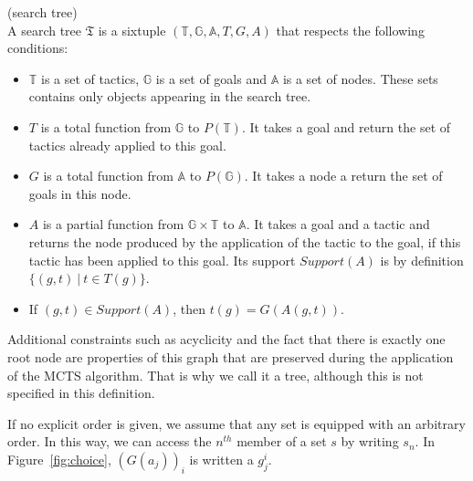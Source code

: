 \documentclass[runningheads,a4paper,draft]{svjour3}
\begin{document}
\begin{definition}(search tree)\\
A search tree $\mathfrak{T}$ is a sixtuple 
$(\mathbb{T},\mathbb{G},\mathbb{A},T,G,A)$ 
that respects the following conditions:
\begin{itemize}
\item $\mathbb{T}$ is a set of tactics, $\mathbb{G}$ is a set of goals 
 and $\mathbb{A}$ is a set of nodes. These sets contains only objects 
 appearing in the search tree.
\item $T$ is a total function from $\mathbb{G}$ to $P(\mathbb{T})$. It takes a 
goal and return the set of tactics already applied to this goal.
\item $G$ is a total function from $\mathbb{A}$ to $P(\mathbb{G})$. It takes a 
node a return the set of goals in this node.

\item $A$ is a partial function from $\mathbb{G} \times \mathbb{T}$ to 
$\mathbb{A}$. It takes a goal and a tactic and returns the node produced by the 
application of the tactic to the goal, if this tactic has been applied to this 
goal. Its support $Support(A)$ is by definition $\lbrace (g,t)\ |\ t \in T(g) 
\rbrace$.
\item If $(g,t) \in Support (A)$, then $t(g) = G(A(g,t))$.
\end{itemize}

Additional constraints such as acyclicity and the fact that there is exactly 
one root node are properties of this graph that are preserved during the 
application of the MCTS algorithm. That is why we call it a tree, although this 
is not specified in this definition.
\end{definition}

If no explicit order is given, we assume that any set is equipped with an 
arbitrary order. In this way, we can access the $n^{th}$ member of a set $s$ by 
writing $s_n$. In Figure~\ref{fig:choice}, $(G(a_j))_i$ is written a $g_j^i$.
\end{document}
